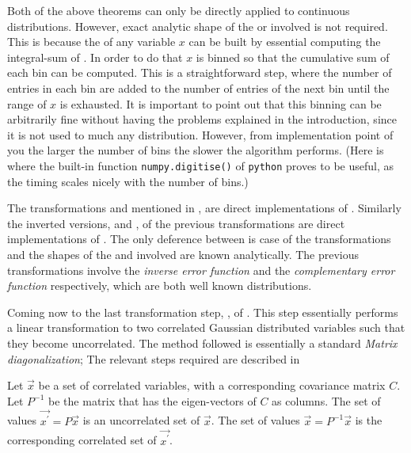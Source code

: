 Both of the above theorems can only be directly applied to continuous distributions.
However, exact analytic shape of the \pdfs or \cdfs involved is not required. This is because the \cdf
of any variable $x$ can be built by essential computing the integral-sum of . In order
to do that $x$ is binned so that the cumulative sum of each bin can be computed. This is a straightforward
step, where the number of entries in each bin are added to the number of entries of the next bin until the 
range of $x$ is exhausted. It is important to point out that this binning can be arbitrarily fine without 
having the problems explained in the introduction, since it is not used to much any distribution.
However, from implementation point of you the larger the number of bins the slower the algorithm performs. 
(Here is where the built-in function {\tt numpy.digitise()} of {\tt python} proves to be useful, as the timing scales
nicely with the number of bins.)

The transformations \gFlat{} and \gGaus{} mentioned in , are direct implementations of
. Similarly the inverted versions, \gFlatInv{} and \gGausInv{},
of the previous transformations are direct implementations of .
The only deference between is case of the transformations \gGaus{} and \gGausInv{} the shapes
of the \pdf and \cdf involved are known analytically. The previous transformations involve the 
{\it inverse error function} and the {\it complementary error function} respectively, which
are both well known distributions.

Coming now to the last transformation step, \gGausUn{}, of .
This step essentially performs a linear transformation to two correlated Gaussian distributed
variables such that they become uncorrelated. The method followed is essentially a standard
{\it Matrix diagonalization}; The relevant steps required are described in 

\begin{method}
 Let $\vec{x}$ be a set of correlated variables, with a corresponding covariance matrix $C$.
 Let $P^{-1}$ be the matrix that has the eigen-vectors of $C$ as columns.
 The set of values $\vec{x^\prime} = P\vec{x}$ is an uncorrelated set of $\vec{x}$.
 The set of values $\vec{x} = P^{-1}\vec{x}$ is the corresponding correlated set of $\vec{x^{\prime}}$.
 \label{meth_matrix_diag}
\end{method}

